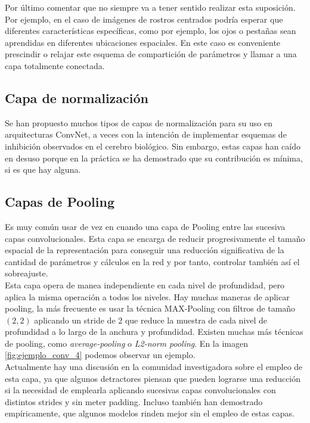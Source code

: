         Por último comentar que no siempre va a tener sentido realizar esta suposición. Por ejemplo, en el caso de imágenes de rostros centrados podría esperar que diferentes características específicas, como por ejemplo, los ojos o pestañas sean aprendidas en diferentes ubicaciones espaciales. En este caso es conveniente prescindir o relajar este esquema de compartición de parámetros y llamar a una capa totalmente conectada.
        
        
        \subsection{Capa de normalización} 
            Se han propuesto muchos tipos de capas de normalización para su uso en arquitecturas ConvNet, a veces con la intención de implementar esquemas de inhibición observados en el cerebro biológico. Sin embargo, estas capas han caído en desuso porque en la práctica se ha demostrado que su contribución es mínima, si es que hay alguna. 
        
        
        \subsection{Capas de Pooling}
        
        Es muy común usar de vez en cuando una capa de Pooling entre las sucesiva capas convolucionales. Esta capa se encarga de reducir progresivamente el tamaño espacial de la representación para conseguir una reducción significativa de la cantidad de parámetros y cálculos en la red y por tanto, controlar también así el sobreajuste. \\
        
        Esta capa opera de manea independiente en cada nivel de profundidad, pero aplica la misma operación a todos los niveles. Hay muchas maneras de aplicar pooling, la más frecuente es usar la técnica MAX-Pooling con filtros de tamaño $(2,2)$ aplicando un stride de $2$ que reduce la muestra de cada nivel de profundidad a lo largo de la anchura y profundidad.  Existen muchas más técnicas de pooling, como \textit{average-pooling} o \textit{L2-norm pooling}. En la imagen \ref{fig:ejemplo_conv_4} podemos observar un ejemplo. \\
        
        
        Actualmente hay una discusión en la comunidad investigadora sobre el empleo de esta capa, ya que algunos detractores piensan que pueden lograrse una reducción si la necesidad de emplearla aplicando sucesivas capas convolucionales con distintos strides y sin meter padding. Incluso también han demostrado empíricamente, que algunos modelos rinden mejor sin el empleo de estas capas. \\
        
